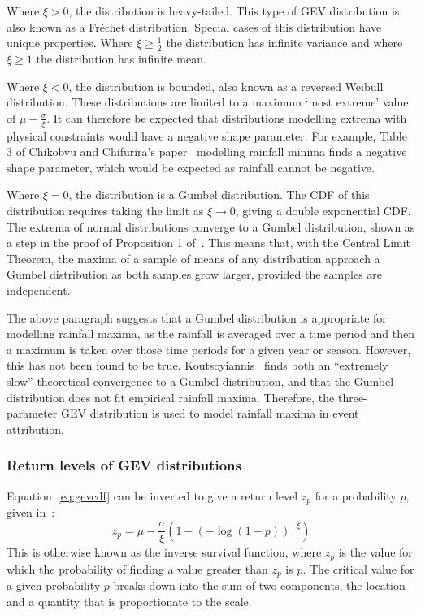 Where $\xi > 0$,
    the distribution is heavy-tailed.
This type of GEV distribution is also known as a Fréchet distribution.
Special cases of this distribution have unique properties.
Where $\xi \geq \frac{1}{2}$ the distribution has infinite variance and
    where $\xi \geq 1$ the distribution has infinite mean.

Where $\xi < 0$, the distribution is bounded,
    also known as a reversed Weibull distribution.
These distributions are limited to a maximum `most extreme' value of $\mu - \frac{\sigma}{\xi}$.
It can therefore be expected that distributions modelling extrema with physical constraints would have a negative shape parameter.
For example, Table 3 of Chikobvu and Chifurira's paper~\cite{Chikobvu_2015} modelling rainfall minima finds a negative shape parameter,
    which would be expected as rainfall cannot be negative.

Where $\xi = 0$,
    the distribution is a Gumbel distribution.
The CDF of this distribution requires taking the limit as $\xi \rightarrow 0$,
    giving a double exponential CDF\@.
The extrema of normal distributions converge to a Gumbel distribution,
    shown as a step in the proof of Proposition 1 of~\cite{Bailey_2014}.
This means that, with the Central Limit Theorem,
    the maxima of a sample of means of any distribution approach a Gumbel distribution as both samples grow larger,
    provided the samples are independent.

The above paragraph suggests that a Gumbel distribution is appropriate for modelling rainfall maxima,
    as the rainfall is averaged over a time period and then a maximum is taken over those time periods for a given year or season.
However, this has not been found to be true.
Koutsoyiannis~\cite{Koutsoyiannis_2003} finds both an ``extremely slow'' theoretical convergence to a Gumbel distribution, and
    that the Gumbel distribution does not fit empirical rainfall maxima.
Therefore, the three-parameter GEV distribution is used to model rainfall maxima in event attribution.

\subsubsection{Return levels of GEV distributions}

Equation~\ref{eq:gevcdf} can be inverted to give a return level $z_p$ for a probability $p$, given in~\cite{Coles_2001}:
\begin{equation}\label{eq:gevreturn}
    z_p = \mu - \frac{\sigma}{\xi}\left( 1-\left( -\log\left( 1-p \right) \right)^{-\xi} \right)
\end{equation}
This is otherwise known as the inverse survival function,
    where $z_p$ is the value for which the probability of finding a value greater than $z_p$ is $p$.
The critical value for a given probability $p$ breaks down into the sum of two components,
    the location and a quantity that is proportionate to the scale.

